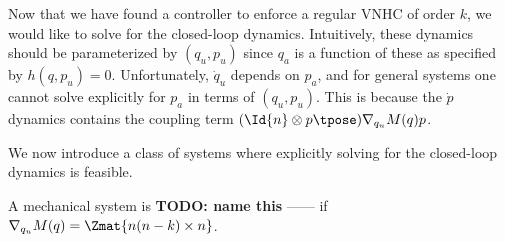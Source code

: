 Now that we have found a controller to enforce a regular VNHC of order \(k\), we
would like to solve for the closed-loop dynamics. Intuitively, these dynamics
should be parameterized by \((q_u, p_u)\) since \(q_a\) is a function of these
as specified by \(h(q,p_u) = 0\).
Unfortunately, \(\dot{q}_u\) depends on \(p_a\), and for general systems one
cannot solve explicitly for \(p_a\) in terms of \((q_u,p_u)\). This is because
the \(\dot{p}\) dynamics contains the coupling term 
\((\Id{n} \otimes p\tpose)\nabla_{q_u}M(q)p\). 

We now introduce a class of systems where explicitly solving for the closed-loop
dynamics is feasible.

\begin{defn}
    A mechanical system is \textbf{TODO: name this} ------ if 
    \(\nabla_{q_u}M(q) = \Zmat{n(n-k) \times n}\).
\end{defn}


